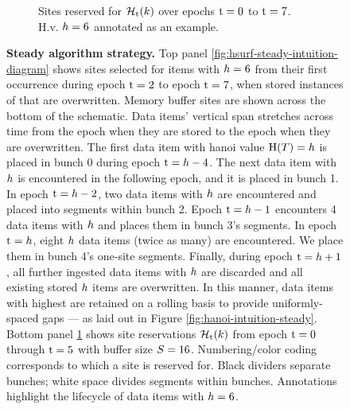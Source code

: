 \begin{figure}[htbp!]
\begin{subfigure}[b]{0.98\linewidth}
\begin{tikzpicture}
    \end{tikzpicture}
    \vspace{-5ex}
    \caption{\footnotesize Sites reserved for \hv{} $\colorHcal_{\colort}(\colork)$ over epochs $\colort=0$ to $\colort=7$. H.v.{} $\colorh=6$ annotated as an example.}
    \label{fig:hsurf-steady-intuition-heatmap}
  \end{subfigure}%
  \vspace{-2ex}
  \caption{
    \textbf{Steady algorithm strategy.}
    \footnotesize
    Top panel \ref{fig:hsurf-steady-intuition-diagram} shows sites selected for items with \hv{} $\colorh=6$ from their first occurrence during epoch $\colort=2$ to epoch $\colort=7$, when stored instances of that \hv{} are overwritten.
    Memory buffer sites are shown across the bottom of the schematic.
    Data items' vertical span stretches across time from the epoch when they are stored to the epoch when they are overwritten.
    The first data item with hanoi value $\colorH(\colorT) = \colorh$ is placed in bunch 0 during epoch $\colort=\colorh-4$.
    The next data item with \hv{} $\colorh$ is encountered in the following epoch, and it is placed in bunch 1.
    In epoch $\colort=\colorh-2$, two data items with \hv{} $\colorh$ are encountered and placed into segments within bunch 2.
    Epoch $\colort=\colorh-1$ encounters 4 data items with \hv{} $\colorh$ and places them in bunch 3's segments.
    In epoch $\colort=\colorh$, eight \hv{} $\colorh$ data items (twice as many) are encountered.
    We place them in bunch 4's one-site segments.
    Finally, during epoch $\colort=\colorh+1$, all further ingested data items with \hv{} $\colorh$ are discarded and all existing stored \hv{} $\colorh$ items are overwritten.
    In this manner, data items with highest \hv{} are retained on a rolling basis to provide uniformly-spaced gaps --- as laid out in Figure \ref{fig:hanoi-intuition-steady}.
    Bottom panel \ref{fig:hsurf-steady-intuition-heatmap} shows \hv{} site reservations $\colorHcal_{\colort}(\colork)$ from epoch $\colort=0$ through $\colort=5$ with buffer size $\colorS=16$.
    Numbering/color coding corresponds to which \hv{} a site is reserved for.
    Black dividers separate bunches; white space divides segments within bunches.
    Annotations highlight the lifecycle of data items with \hv{} $\colorh=6$.
  }
  \label{fig:hsurf-steady-intuition}
\end{figure}
